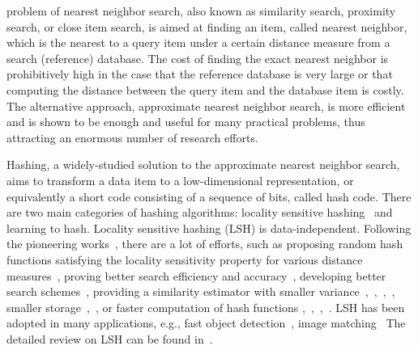 \documentclass[10pt,journal,compsoc]{IEEEtran}
\begin{document}
%
\IEEEpeerreviewmaketitle


problem of nearest neighbor search,
also known as
similarity search,
proximity search,
or close item search,
is aimed at finding an item,
called nearest neighbor,
which is the nearest
to a query item
under a certain distance measure
from a search (reference) database.
The cost of finding the exact nearest neighbor
is prohibitively high
in the case that the reference database
is very large
or that computing the distance
between the query item and the database item
is costly.
The alternative approach,
approximate nearest neighbor search,
is more efficient
and is shown to
be enough and useful
for many practical problems,
thus attracting an enormous number of research efforts.


Hashing, a widely-studied solution to the approximate nearest neighbor search,
aims to
transform a data item
to a low-dimensional representation,
or equivalently a short code consisting of a sequence of bits,
called hash code.
There are two main categories of hashing algorithms:
locality sensitive hashing~\cite{IndykM98, Charikar02} and learning to hash.
Locality sensitive hashing (LSH) is data-independent.
Following the pioneering works~\cite{IndykM98, Charikar02},
there are a lot of efforts,
such as proposing random hash functions
satisfying the locality sensitivity property
for various distance measures~\cite{Broder97, BroderGMZ97, DatarIIM04, Charikar02, DasguptaKS11, MotwaniNP07, ODonnellWZ11},
proving better search efficiency and accuracy~\cite{Panigrahy06, DasguptaKS11},
developing better search schemes~\cite{LvJWCL07, GanFFN12, GanFFN12},
providing a similarity estimator
with smaller variance~\cite{LiCH06},~\cite{JiLYZT12},~\cite{LiOZ12},~\cite{JiLYTZ13},
smaller storage~\cite{LiK10b},~\cite{LiKG10a},
or faster computation of hash functions \cite{LiHC06},~\cite{LiOZ12},~\cite{JiLYTZ13},~\cite{ShrivastavaL14}.
LSH has been adopted in many applications,
e.g., fast object detection~\cite{DeanRSSVY13},
image matching~\cite{MoonNPLSHP16, ChumM10}
The detailed review on LSH can be found in~\cite{WangSSJ14}.
\end{document}
